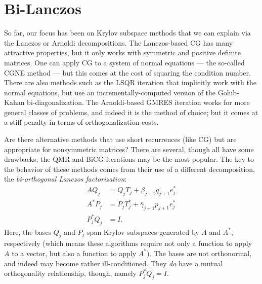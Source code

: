 \section{Bi-Lanczos}

So far, our focus has been on Krylov subspace methods that we can
explain via the Lanczos or Arnoldi decompositions.  The Lanczos-based
CG has many attractive properties, but it only works with symmetric
and positive definite matrices.  One can apply CG to a system of normal
equations --- the so-called CGNE method --- but this comes at the cost
of squaring the condition number.  There are also methods such as the
LSQR iteration that implicitly work with the normal equations, but use
an incrementally-computed version of the Golub-Kahan bi-diagonalization.
The Arnoldi-based GMRES iteration works for more general classes
of problems, and indeed it is the method of choice; but it comes at
a stiff penalty in terms of orthogonalization costs.

Are there alternative methods that use short recurrences (like CG) but
are appropriate for nonsymmetric matrices?  There are several, though
all have some drawbacks; the QMR and BiCG iterations may be the most
popular.  The key to the behavior of these methods comes from their
use of a different decomposition, the {\em bi-orthogonal Lanczos
factorization}:
\begin{align*}
  A Q_j &= Q_j T_j + \beta_{j+1} q_{j+1} e_j^* \\
  A^* P_j &= P_j T_j^* + \bar{\gamma}_{j+1} p_{j+1} e_j^* \\
  P_j^* Q_j &= I.
\end{align*}
Here, the bases $Q_j$ and $P_j$ span Krylov subspaces generated
by $A$ and $A^*$, respectively (which means these algorithms require
not only a function to apply $A$ to a vector, but also a function
to apply $A^*$).  The bases are not orthonormal, and indeed may become
rather ill-conditioned.  They {\em do} have a mutual orthogonality
relationship, though, namely $P_j^* Q_j = I$.

